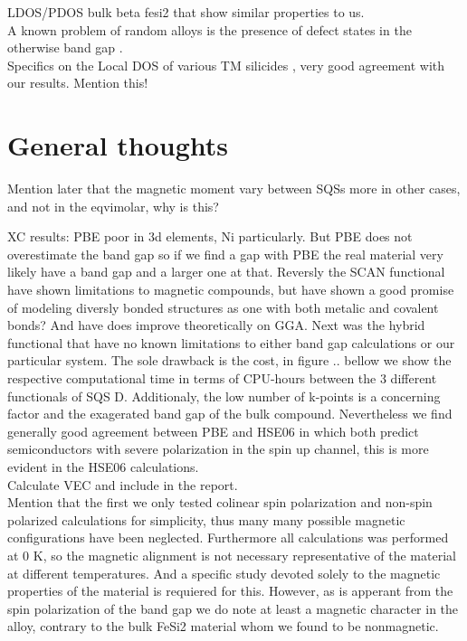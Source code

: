 LDOS/PDOS bulk beta fesi2 \cite{doi:10.1063/1.346415} that show similar properties to us. \\

A known problem of random alloys is the presence of defect states in the otherwise band gap \cite{PhysRevLett.104.236403}.  \\

Specifics on the Local DOS of various TM silicides \cite{lange1997electronic}, very good agreement with our results. Mention this! \\

\section{General thoughts}

Mention later that the magnetic moment vary between SQSs more in other cases, and not in the eqvimolar, why is this? 

XC results: PBE poor in 3d elements, Ni particularly. But PBE does not overestimate the band gap so if we find a gap with PBE the real material very likely have a band gap and a larger one at that. Reversly the SCAN functional have shown limitations to magnetic compounds, but have shown a good promise of modeling diversly bonded structures as one with both metalic and covalent bonds? And have does improve theoretically on GGA. Next was the hybrid functional that have no known limitations to either band gap calculations or our particular system. The sole drawback is the cost, in figure .. bellow we show the respective computational time in terms of CPU-hours between the 3 different functionals of SQS D. Additionaly, the low number of k-points is a concerning factor and the exagerated band gap of the bulk compound. Nevertheless we find generally good agreement between PBE and HSE06 in which both predict semiconductors with severe polarization in the spin up channel, this is more evident in the HSE06 calculations. \\

Calculate VEC and include in the report. \\

Mention that the first we only tested colinear spin polarization and non-spin polarized calculations for simplicity, thus many many possible magnetic configurations have been neglected. Furthermore all calculations was performed at 0 K, so the magnetic alignment is not necessary representative of the material at different temperatures. And a specific study devoted solely to the magnetic properties of the material is requiered for this. However, as is apperant from the spin polarization of the band gap we do note at least a magnetic character in the alloy, contrary to the bulk FeSi2 material whom we found to be nonmagnetic. \\

